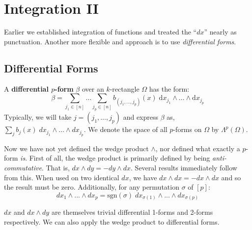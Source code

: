 \chapter{Integration II}

Earlier we established integration of functions and treated the ``$dx$'' nearly as punctuation.
Another more flexible and approach is to use \emph{differential forms}.




%
%

\section{Differential Forms}



\begin{definition}
	A \textbf{differential $p$-form} $\beta$ over an $k$-rectangle $\Omega$ has the form:
	\begin{equation}
		\beta = \sum_{j_1 \in [n]} \ldots \sum_{j_p \in [n]} b_{(j_1, \ldots, j_p)}(x) \; 
				\text{d} x_{j_1} \wedge \ldots \wedge \text{d} x_{j_p}
	\end{equation}
	Typically, we will take $j = (j_1, \ldots, j_p)$ and express $\beta$ as, 
	$\sum_j b_j(x) \; dx_{j_1} \wedge \ldots \wedge dx_{j_p}$.
	We denote the space of all $p$-forms on $\Omega$ by $\Lambda^p(\Omega)$.
\end{definition}



Now we have not yet defined the wedge product $\wedge$, nor defined what exactly a $p$-form \emph{is}.
First of all, the wedge product is primarily defined by being \emph{anti-commutative}.
That is, $dx \wedge dy = -dy \wedge dx$.
Several results immediately follow from this.
When used on two identical $dx$, we have $dx \wedge dx = - dx \wedge dx$ and so the result must be zero.
Additionally, for any permutation $\sigma$ of $[p]$:
\begin{equation}
	dx_1 \wedge ... \wedge dx_p = \text{sgn}(\sigma) \; dx_{\sigma(1)} \wedge ... \wedge dx_{\sigma(p)}
\end{equation}


$dx$ and $dx \wedge dy$ are themselves trivial differential 1-forms and 2-forms respectively.
We can also apply the wedge product to differential forms.


